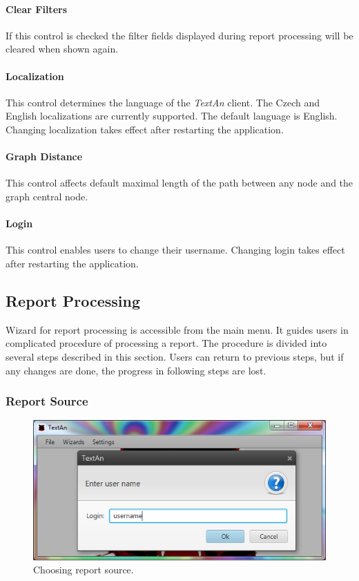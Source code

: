 \documentclass[12pt,a4paper]{report}
\newcommand{\textan}{\emph{TextAn}}
\begin{document}
\paragraph{Clear Filters} If this control is checked the filter fields
displayed during report processing will be cleared when shown again.

\paragraph{Localization} This control determines the language of the \textan{}
client. The Czech and English localizations are currently supported. The
default language is English. Changing localization takes effect after
restarting the application.

\paragraph{Graph Distance} This control affects default maximal length of the
path between any node and the graph central node.

\paragraph{Login} This control enables users to change their username. Changing
login takes effect after restarting the application.

\subsection{Report Processing}
\label{ssec:ProcessReport}

Wizard for report processing is accessible from the main menu. It guides
users in complicated procedure of processing a report. The procedure is divided
into several steps described in this section. Users can return to previous
steps, but if any changes are done, the progress in following steps are lost.

\subsubsection{Report Source}

\begin{figure}[!htb]
        \centering
        \includegraphics[width=\textwidth]{Images/source}
        \caption{Choosing report source.}
        \label{fig:Source}
\end{figure}
\end{document}
